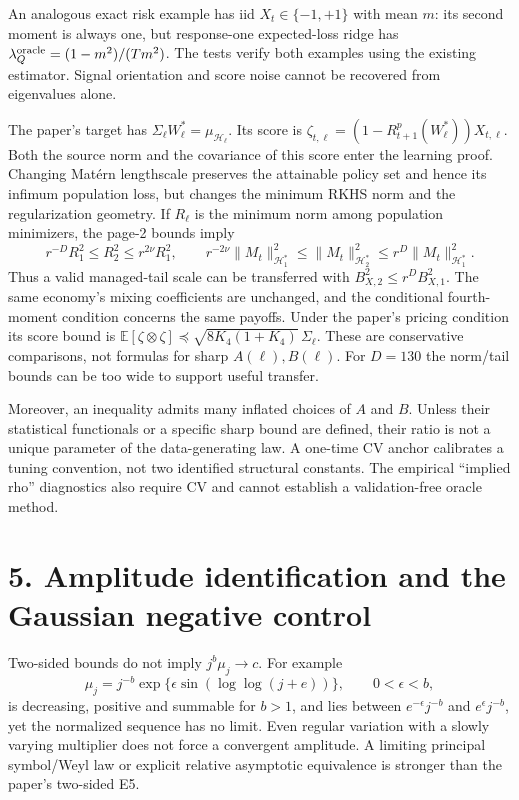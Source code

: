 \documentclass[11pt,letterpaper]{article}
\newcommand{\Hh}{\mathcal H}
\newcommand{\E}{\mathbb E}
\begin{document}
An analogous exact risk example has iid $X_t\in\{-1,+1\}$ with mean $m$:
its second moment is always one, but response-one expected-loss ridge has
$\lambda_Q^{\rm oracle}=(1-m^2)/(Tm^2)$. The tests verify both examples using
the existing estimator. Signal orientation and score noise cannot be recovered
from eigenvalues alone.

The paper's target has $\Sigma_\ell W_\ell^*=\mu_{\Hh_\ell}$. Its score is
$\zeta_{t,\ell}=(1-R^p_{t+1}(W_\ell^*))X_{t,\ell}$. Both the source norm and
the covariance of this score enter the learning proof. Changing Mat\'ern
lengthscale preserves the attainable policy set and hence its infimum population
loss, but changes the minimum RKHS norm and the regularization geometry.
If $R_\ell$ is the minimum norm among population minimizers, the page-2 bounds imply
\[
 r^{-D}R_1^2\leq R_2^2\leq r^{2\nu}R_1^2,\qquad
 r^{-2\nu}\|M_t\|_{\Hh_1^*}^2\leq\|M_t\|_{\Hh_2^*}^2
 \leq r^D\|M_t\|_{\Hh_1^*}^2.
\]
Thus a valid managed-tail scale can be transferred with
$B_{X,2}^2\leq r^D B_{X,1}^2$. The same economy's mixing coefficients are
unchanged, and the conditional fourth-moment condition concerns the same payoffs.
Under the paper's pricing condition its score bound is
$\E[\zeta\otimes\zeta]\preceq\sqrt{8K_4(1+K_4)}\,\Sigma_\ell$.
These are conservative comparisons, not formulas for sharp $A(\ell),B(\ell)$.
For $D=130$ the norm/tail bounds can be too wide to support useful transfer.

Moreover, an inequality admits many inflated choices of $A$ and $B$.
Unless their statistical functionals or a specific sharp bound are defined,
their ratio is not a unique parameter of the data-generating law. A one-time
CV anchor calibrates a tuning convention, not two identified structural constants.
The empirical ``implied rho'' diagnostics also require CV and cannot establish
a validation-free oracle method.

\newpage
\section*{5. Amplitude identification and the Gaussian negative control}
Two-sided bounds do not imply $j^b\mu_j\to c$. For example
\[
 \mu_j=j^{-b}\exp\{\epsilon\sin(\log\log(j+e))\},\qquad 0<\epsilon<b,
\]
is decreasing, positive and summable for $b>1$, and lies between
$e^{-\epsilon}j^{-b}$ and $e^{\epsilon}j^{-b}$, yet the normalized sequence
has no limit. Even regular variation with a slowly varying multiplier does not
force a convergent amplitude. A limiting principal symbol/Weyl law or explicit
relative asymptotic equivalence is stronger than the paper's two-sided E5.
\end{document}
